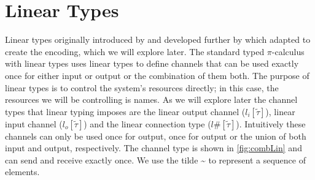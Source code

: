 

\section{Linear Types} \label{LinearTypes}

Linear types originally introduced by \citep{kobayashi1999linearity} and developed further by \citep{sangiorgi2003pi} which \citep{dardha2017session} adapted to create the encoding, which we will explore later. The standard typed $\pi$-calculus with linear types uses linear types to define channels that can be used exactly once for either input or output or the combination of them both. The purpose of linear types is to control the system's resources directly; in this case, the resources we will be controlling is names. As we will explore later the channel types that linear typing imposes are the linear output channel ($l_i[\widetilde{\tau}]$), linear input channel ($l_o[\widetilde{\tau}]$) and the linear connection type ($l\#[\widetilde{\tau}]$). Intuitively these channels can only be used once for output, once for output or the union of both input and output, respectively. The channel type is shown in \autoref{fig:combLin} and can send and receive exactly once. We use the tilde \textasciitilde \hspace{1pt} to represent a sequence of elements. 


